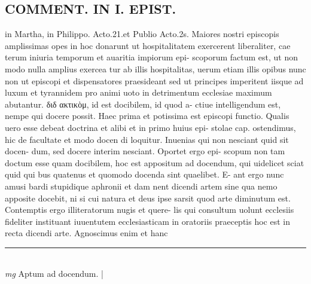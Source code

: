 \documentclass{article}
\begin{document}
\begin{pages}
\section*{COMMENT. IN I. EPIST. }\pstart in Martha, in Philippo. Acto.21.et Publio Acto.2s. Maiores nostri episcopis amplissimas opes in hoc donarunt ut hospitalitatem exercerent liberaliter, cae terum iniuria temporum et auaritia impiorum epi- scoporum factum est, ut non modo nulla amplius exercea tur ab illis hospitalitas, uerum etiam illis opibus nunc non ut episcopi et dispensatores praesideant sed ut principes imperitent iisque ad luxum et tyrannidem pro animi uoto in detrimentum ecclesiae maximum abutantur. διδ ακτικὸμ, id est docibilem, id quod a- ctiue intelligendum est, nempe qui docere possit. Haec prima et potissima est episcopi functio. Qualis uero esse debeat doctrina et alibi et in primo huius epi- stolae cap. ostendimus, hic de facultate et modo docen di loquitur. Inuenias qui non nesciant quid sit docen- dum, sed docere interim nesciant. Oportet ergo epi- scopum non tam doctum esse quam docibilem, hoc est appositum ad docendum, qui uidelicet sciat quid qui bus quatenus et quomodo docenda sint quaelibet. E- ant ergo nunc amusi bardi stupidique aphronii et dam nent dicendi artem sine qua nemo apposite docebit, ni si cui natura et deus ipse sarsit quod arte diminutum est. Contemptis ergo illiteratorum nugis et quere- lis qui consultum uolunt ecclesiis fideliter instituant iuuentutem ecclesiasticam in oratoriis praeceptis hoc est in recta dicendi arte. Agnoscimus enim et hanc  \pend
\vspace{0.5cm}\noindent
\vspace{0.2cm}\rule{1cm}{0.2pt}\\ 
\hspace{0.2cm}\textit{mg}
\footnotesize Aptum ad docendum. 
\normalsize| 

\end{pages}
\end{document}

